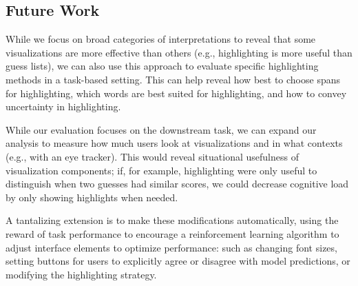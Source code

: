 

\subsection{Future Work}

While we focus on broad categories of interpretations to reveal that
some visualizations are more effective than others (e.g., highlighting
is more useful than guess lists), we can also use this approach to
evaluate specific highlighting methods in a task-based setting.  This
can help reveal how best to choose spans for highlighting, which words are best
suited for highlighting, and how to convey uncertainty in
highlighting.

While our evaluation focuses on the downstream task, we can expand
our analysis to measure how much users look at visualizations and in
what contexts (e.g., with an eye tracker).  This would reveal situational usefulness of
visualization components; if, for example, highlighting were only
useful to distinguish when two guesses had similar scores, we could
decrease cognitive load by only showing highlights when needed.

A tantalizing extension is to make these modifications automatically,
using the reward of task performance to encourage a reinforcement
learning algorithm to adjust interface elements to optimize
performance: such as changing font sizes, setting buttons for users to
explicitly agree or disagree with model predictions, or modifying the
highlighting strategy.

